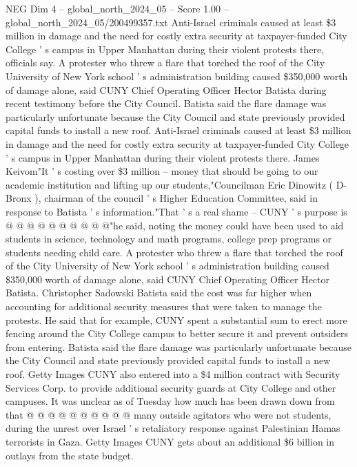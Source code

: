 \begin{textsample}{NEG Dim 4 – global\_north\_2024\_05 – Score 1.00 – global\_north\_2024\_05/200499357.txt}  \label{ex:f4_neg_121}
Anti-Israel criminals caused at least \$3 million in damage and the need for costly extra security at taxpayer-funded City College ' s campus in Upper Manhattan during their violent protests there, officials say.
A protester who threw a flare that torched the roof of the City University of New York school ' s administration building caused \$350,000 worth of damage alone, said CUNY Chief Operating Officer Hector Batista during recent testimony before the City Council.
Batista said the flare damage was particularly unfortunate because the City Council and state previously provided capital funds to install a new roof.
Anti-Israel criminals caused at least \$3 million in damage and the need for costly extra security at taxpayer-funded City College ' s campus in Upper Manhattan during their violent protests there.
James Keivom"It ' s costing over \$3 million -- money that should be going to our academic institution and lifting up our students,"Councilman Eric Dinowitz ( D-Bronx ), chairman of the council ' s Higher Education Committee, said in response to Batista ' s information."That ' s a real shame -- CUNY ' s purpose is @ @ @ @ @ @ @ @ @ @"he said, noting the money could have been used to aid students in science, technology and math programs, college prep programs or students needing child care.
A protester who threw a flare that torched the roof of the City University of New York school ' s administration building caused \$350,000 worth of damage alone, said CUNY Chief Operating Officer Hector Batista.
Christopher Sadowski Batista said the cost was far higher when accounting for additional security measures that were taken to manage the protests.
He said that for example, CUNY spent a substantial sum to erect more fencing around the City College campus to better secure it and prevent outsiders from entering.
Batista said the flare damage was particularly unfortunate because the City Council and state previously provided capital funds to install a new roof.
Getty Images CUNY also entered into a \$4 million contract with Security Services Corp. to provide additional security guards at City College and other campuses.
It was unclear as of Tuesday how much has been drawn down from that @ @ @ @ @ @ @ @ @ @ many outside agitators who were not students, during the unrest over Israel ' s retaliatory response against Palestinian Hamas terrorists in Gaza.
Getty Images CUNY gets about an additional \$6 billion in outlays from the state budget.

\end{textsample}
